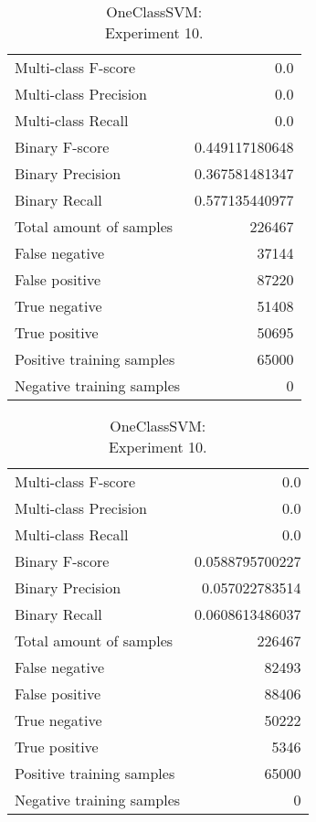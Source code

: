 \begin{table}[H]
\begin{minipage}{0.5\textwidth}
\caption{OneClassSVM: \\Experiment 9.}
\centering
\begin{tabular}{l r}
\toprule
Multi-class F-score & 0.0 \\
Multi-class Precision & 0.0 \\
Multi-class Recall & 0.0 \\
\midrule
Binary F-score & 0.449117180648 \\
Binary Precision & 0.367581481347 \\
Binary Recall & 0.577135440977 \\
\midrule
Total amount of samples & 226467 \\
False negative & 37144 \\
False positive & 87220 \\
True negative & 51408 \\
True positive & 50695 \\
\midrule
Positive training samples & 65000 \\
Negative training samples & 0 \\
\bottomrule
\end{tabular}
\end{minipage}
\hfillx
\begin{minipage}{0.5\textwidth}
\caption{OneClassSVM: \\Experiment 10.}
\centering
\begin{tabular}{l r}
\toprule
Multi-class F-score & 0.0 \\
Multi-class Precision & 0.0 \\
Multi-class Recall & 0.0 \\
\midrule
Binary F-score & 0.0588795700227 \\
Binary Precision & 0.057022783514 \\
Binary Recall & 0.0608613486037 \\
\midrule
Total amount of samples & 226467 \\
False negative & 82493 \\
False positive & 88406 \\
True negative & 50222 \\
True positive & 5346 \\
\midrule
Positive training samples & 65000 \\
Negative training samples & 0 \\
\bottomrule
\end{tabular}
\end{minipage}
\end{table}
